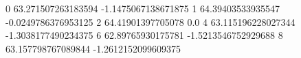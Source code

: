 0 63.271507263183594 -1.1475067138671875
1 64.39403533935547 -0.0249786376953125
2 64.41901397705078 0.0
4 63.115196228027344 -1.3038177490234375
6 62.89765930175781 -1.5213546752929688
8 63.157798767089844 -1.2612152099609375
